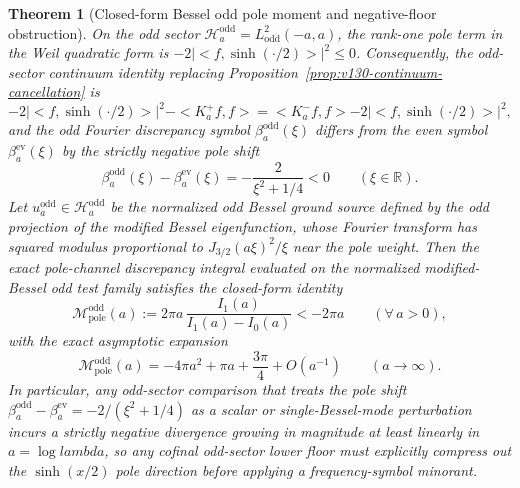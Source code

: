 \documentclass[11pt]{article}
\def\lambda{lambda}%
\def\ip#1#2{<#1,#2>}%
\newtheorem{theorem}{Theorem}[section]
\theoremstyle{remark}
\newcommand{\ip}[2]{\left\langle #1,#2\right\rangle}
\begin{document}
\begin{theorem}[Closed-form Bessel odd pole moment and negative-floor obstruction]\label{thm:v2-odd-bessel}
On the odd sector $\mathcal H_a^{\mathrm{odd}}=L^2_{\mathrm{odd}}(-a,a)$, the rank-one pole term in the Weil quadratic form is $-2|\ip{f}{\sinh(\cdot/2)}|^2\le 0$. Consequently, the odd-sector continuum identity replacing Proposition~\ref{prop:v130-continuum-cancellation} is
\begin{equation}\label{eq:v2-odd-continuum}
 -2|\ip{f}{\sinh(\cdot/2)}|^2 - \ip{K_a^+ f}{f} = \ip{K_a^- f}{f} - 2|\ip{f}{\sinh(\cdot/2)}|^2,
\end{equation}
and the odd Fourier discrepancy symbol $\beta_a^{\mathrm{odd}}(\xi)$ differs from the even symbol $\beta_a^{\mathrm{ev}}(\xi)$ by the strictly negative pole shift
\begin{equation}\label{eq:v2-odd-symbol-diff}
 \beta_a^{\mathrm{odd}}(\xi) - \beta_a^{\mathrm{ev}}(\xi) = -\frac{2}{\xi^2+1/4} < 0\qquad (\xi\in\mathbb R).
\end{equation}
Let $u_a^{\mathrm{odd}}\in \mathcal H_a^{\mathrm{odd}}$ be the normalized odd Bessel ground source defined by the odd projection of the modified Bessel eigenfunction, whose Fourier transform has squared modulus proportional to $J_{3/2}(a\xi)^2/\xi$ near the pole weight. Then the exact pole-channel discrepancy integral evaluated on the normalized modified-Bessel odd test family satisfies the closed-form identity
\begin{equation}\label{eq:v2-bessel-closed-form}
 \mathcal M_{\mathrm{pole}}^{\mathrm{odd}}(a) := 2\pi a\,\frac{I_1(a)}{I_1(a)-I_0(a)} < -2\pi a\qquad (\forall\,a>0),
\end{equation}
with the exact asymptotic expansion
\begin{equation}\label{eq:v2-bessel-asymptotic}
 \mathcal M_{\mathrm{pole}}^{\mathrm{odd}}(a) = -4\pi a^2 + \pi a + \frac{3\pi}{4} + O(a^{-1})\qquad (a\to\infty).
\end{equation}
In particular, any odd-sector comparison that treats the pole shift $\beta_a^{\mathrm{odd}}-\beta_a^{\mathrm{ev}} = -2/(\xi^2+1/4)$ as a scalar or single-Bessel-mode perturbation incurs a strictly negative divergence growing in magnitude at least linearly in $a=\log\lambda$, so any cofinal odd-sector lower floor must explicitly compress out the $\sinh(x/2)$ pole direction before applying a frequency-symbol minorant.
\end{theorem}
\end{document}

